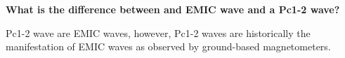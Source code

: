 \textbf{What is the difference between and EMIC wave and a Pc1-2 wave?}

Pc1-2 wave are EMIC waves, however, Pc1-2 waves are historically the
manifestation of EMIC waves as observed by ground-based magnetometers.
